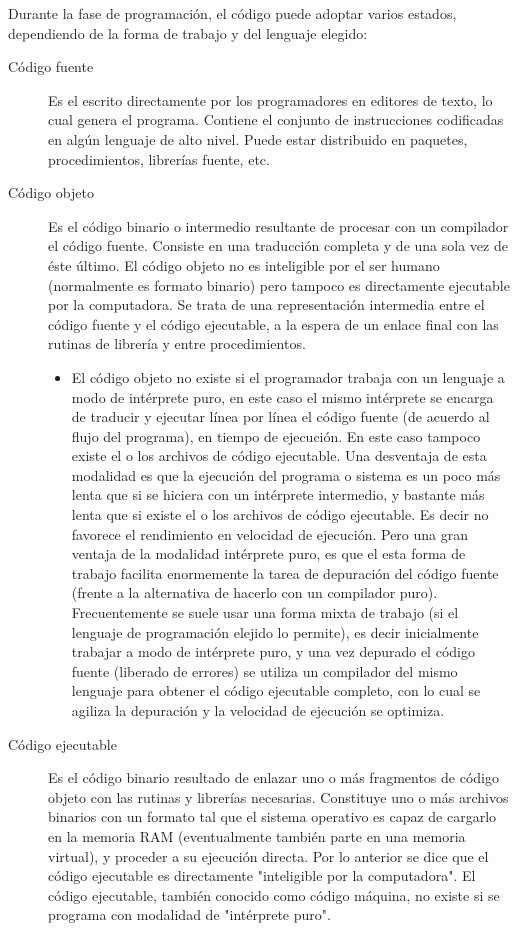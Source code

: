 \documentclass[12pt,legalpaper]{report}
\begin{document}
Durante la fase de programación, el código puede adoptar varios estados, dependiendo de la forma de trabajo y del lenguaje elegido:
\begin{description}

    \item[Código fuente] Es el escrito directamente por los programadores en editores de texto, lo cual genera el programa. Contiene el conjunto de instrucciones codificadas en algún lenguaje de alto nivel. Puede estar distribuido en paquetes, procedimientos, librerías fuente, etc.

    \item[Código objeto] Es el código binario o intermedio resultante de procesar con un compilador el código fuente. Consiste en una traducción completa y de una sola vez de éste último. El código objeto no es inteligible por el ser humano (normalmente es formato binario) pero tampoco es directamente ejecutable por la computadora. Se trata de una representación intermedia entre el código fuente y el código ejecutable, a la espera de un enlace final con las rutinas de librería y entre procedimientos.

	\begin{itemize}
		\item El código objeto no existe si el programador trabaja con un lenguaje a modo de intérprete puro, en este caso el mismo intérprete se encarga de traducir y ejecutar línea por línea el código fuente (de acuerdo al flujo del programa), en tiempo de ejecución. En este caso tampoco existe el o los archivos de código ejecutable. Una desventaja de esta modalidad es que la ejecución del programa o sistema es un poco más lenta que si se hiciera con un intérprete intermedio, y bastante más lenta que si existe el o los archivos de código ejecutable. Es decir no favorece el rendimiento en velocidad de ejecución. Pero una gran ventaja de la modalidad intérprete puro, es que el esta forma de trabajo facilita enormemente la tarea de depuración del código fuente (frente a la alternativa de hacerlo con un compilador puro). Frecuentemente se suele usar una forma mixta de trabajo (si el lenguaje de programación elejido lo permite), es decir inicialmente trabajar a modo de intérprete puro, y una vez depurado el código fuente (liberado de errores) se utiliza un compilador del mismo lenguaje para obtener el código ejecutable completo, con lo cual se agiliza la depuración y la velocidad de ejecución se optimiza.
	\end{itemize}

	\item[Código ejecutable] Es el código binario resultado de enlazar uno o más fragmentos de código objeto con las rutinas y librerías necesarias. Constituye uno o más archivos binarios con un formato tal que el sistema operativo es capaz de cargarlo en la memoria RAM (eventualmente también parte en una memoria virtual), y proceder a su ejecución directa. Por lo anterior se dice que el código ejecutable es directamente "inteligible por la computadora". El código ejecutable, también conocido como código máquina, no existe si se programa con modalidad de "intérprete puro".
\end{description}
\end{document}
